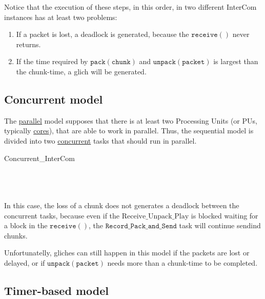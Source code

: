 Notice that the execution of these steps, in this order, in two
different InterCom instances has at least two problems:
\begin{enumerate}
\item If a packet is lost, a deadlock is generated, because the
  $\mathtt{receive()}$ never returns.
\item If the time required by $\mathtt{pack(chunk)}$ and
  $\mathtt{unpack(packet)}$ is largest than the chunk-time, a glich
  will be generated.
\end{enumerate}

\subsection{Concurrent model}

The \href{https://en.wikipedia.org/wiki/Parallel_computing}{parallel}
model supposes that there is at least two Processing Units (or PUs,
typically
\href{https://en.wikipedia.org/wiki/Multi-core_processor}{cores}),
that are able to work in parallel. Thus, the sequential model is
divided into two
\href{https://en.wikipedia.org/wiki/Concurrency_(computer_science)}{concurrent}
tasks that should run in parallel.

\begin{pseudocode}{Concurrent\_InterCom}{~}
  \BEGIN
     \GETS {}\\
     \GETS {}\\
  \END
  \ENDPROCEDURE
  \BEGIN
     \GETS {}\\
     \GETS {}\\
  \END
  \ENDPROCEDURE
\end{pseudocode}

In this case, the loss of a chunk does not generates a deadlock
between the concurrent tasks, because even if the
$\mathrm{Receive\_Unpack\_Play}$ is blocked waiting for a block in the
$\mathtt{receive()}$, the $\mathtt{Record\_Pack\_and\_Send}$ task will
continue sendind chunks.

Unfortunatelly, gliches can still happen in this model if the packets
are lost or delayed, or if $\mathtt{unpack(packet)}$ needs more than a
chunk-time to be completed.

\subsection{Timer-based model}

